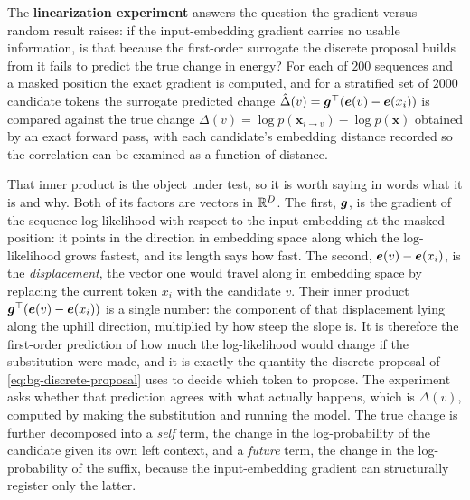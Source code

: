 The \textbf{linearization experiment} answers the question the gradient-versus-random result raises: if the input-embedding gradient carries no usable information, is that because the first-order surrogate the discrete proposal builds from it fails to predict the true change in energy? For each of $200$ sequences and a masked position the exact gradient is computed, and for a stratified set of $2000$ candidate tokens the surrogate predicted change $\hat{\Delta}(v) = \bm{g}^\top(\bm{e}(v) - \bm{e}(x_i))$ is compared against the true change $\Delta(v) = \log p(\bm{x}_{i\to v}) - \log p(\bm{x})$ obtained by an exact forward pass, with each candidate's embedding distance recorded so the correlation can be examined as a function of distance.

That inner product is the object under test, so it is worth saying in words what it is and why. Both of its factors are vectors in $\mathbb{R}^{D}$. The first, $\bm{g}$, is the gradient of the sequence log-likelihood with respect to the input embedding at the masked position: it points in the direction in embedding space along which the log-likelihood grows fastest, and its length says how fast. The second, $\bm{e}(v) - \bm{e}(x_i)$, is the \emph{displacement}, the vector one would travel along in embedding space by replacing the current token $x_i$ with the candidate $v$. Their inner product $\bm{g}^\top(\bm{e}(v) - \bm{e}(x_i))$ is a single number: the component of that displacement lying along the uphill direction, multiplied by how steep the slope is. It is therefore the first-order prediction of how much the log-likelihood would change if the substitution were made, and it is exactly the quantity the discrete proposal of \eqref{eq:bg-discrete-proposal} uses to decide which token to propose. The experiment asks whether that prediction agrees with what actually happens, which is $\Delta(v)$, computed by making the substitution and running the model. The true change is further decomposed into a \emph{self} term, the change in the log-probability of the candidate given its own left context, and a \emph{future} term, the change in the log-probability of the suffix, because the input-embedding gradient can structurally register only the latter.

